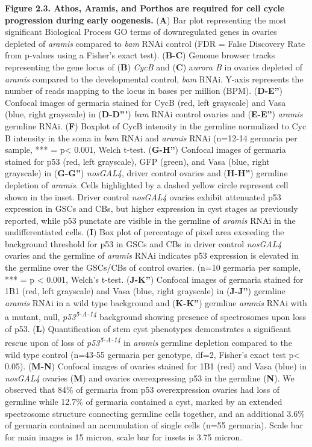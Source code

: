 \documentclass[12pt,twoside]{reedthesis}
\begin{document}
\textbf{Figure 2.3. Athos, Aramis, and Porthos are required for cell cycle
progression during early oogenesis.} (\textbf{A}) Bar plot representing the
most significant Biological Process GO terms of downregulated genes in
ovaries depleted of \emph{aramis} compared to \emph{bam} RNAi control (FDR = False
Discovery Rate from p-values using a Fisher's exact test). (\textbf{B-C})
Genome browser tracks representing the gene locus of (\textbf{B}) \emph{CycB} and
(\textbf{C}) a\emph{urora B} in ovaries depleted of \emph{aramis} compared to the
developmental control, \emph{bam} RNAi. Y-axis represents the number of reads
mapping to the locus in bases per million (BPM). (\textbf{D-E''}) Confocal
images of germaria stained for CycB (red, left grayscale) and Vasa
(blue, right grayscale) in (\textbf{D-D'''}) \emph{bam} RNAi control ovaries and
(\textbf{E-E''}) \emph{aramis} germline RNAi. (\textbf{F}) Boxplot of CycB intensity in
the germline normalized to Cyc B intensity in the soma in \emph{bam} RNAi and
\emph{aramis} RNAi (n=12-14 germaria per sample, *** = p\textless{} 0.001, Welch
t-test. (\textbf{G-H''}) Confocal images of germaria stained for p53 (red,
left grayscale), GFP (green), and Vasa (blue, right grayscale) in
(\textbf{G-G''}) \emph{nosGAL4}, driver control ovaries and (\textbf{H-H''}) germline
depletion of \emph{aramis}. Cells highlighted by a dashed yellow circle
represent cell shown in the inset. Driver control \emph{nosGAL4} ovaries
exhibit attenuated p53 expression in GSCs and CBs, but higher expression
in cyst stages as previously reported, while p53 punctate are visible in
the germline of \emph{aramis} RNAi in the undifferentiated cells. (\textbf{I}) Box
plot of percentage of pixel area exceeding the background threshold for
p53 in GSCs and CBs in driver control \emph{nosGAL4} ovaries and the germline
of \emph{aramis} RNAi indicates p53 expression is elevated in the germline
over the GSCs/CBs of control ovaries. (n=10 germaria per sample, ***
= p \textless{} 0.001, Welch's t-test. (\textbf{J-K''}) Confocal images of germaria
stained for 1B1 (red, left grayscale) and Vasa (blue, right grayscale)
in (\textbf{J-J''}) germline \emph{aramis} RNAi in a wild type background and
(\textbf{K-K''}) germline \emph{aramis} RNAi with a mutant, null, \emph{p53\textsuperscript{5-A-14}}
background showing presence of spectrosomes upon loss of p53. (\textbf{L})
Quantification of stem cyst phenotypes demonstrates a significant rescue
upon of loss of \emph{p53\textsuperscript{5-A-14}} in \emph{aramis} germline depletion compared to
the wild type control (n=43-55 germaria per genotype, df=2, Fisher's
exact test p\textless{} 0.05). (\textbf{M-N}) Confocal images of ovaries stained for
1B1 (red) and Vasa (blue) in \emph{nosGAL4} ovaries (\textbf{M}) and ovaries
overexpressing p53 in the germline (\textbf{N}). We observed that 84\% of
germaria from p53 overexpression ovaries had loss of germline while
12.7\% of germaria contained a cyst, marked by an extended spectrosome
structure connecting germline cells together, and an additional 3.6\% of
germaria contained an accumulation of single cells (n=55 germaria).
Scale bar for main images is 15 micron, scale bar for insets is 3.75
micron.
\end{document}
